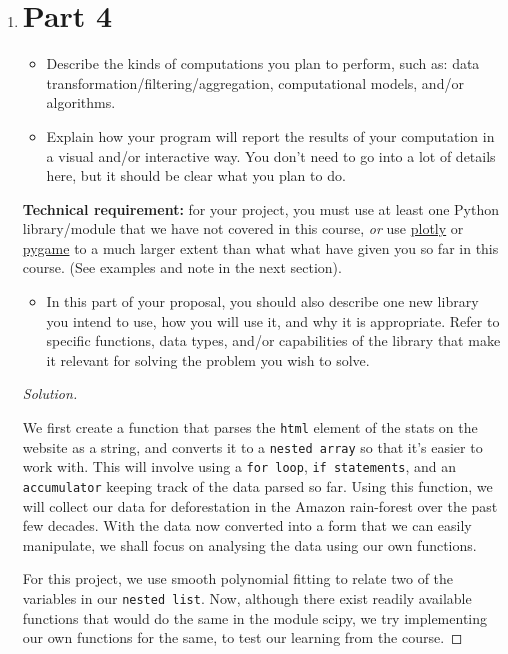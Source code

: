 \documentclass[12pt]{article}
\newenvironment{solution}
  {\renewcommand\qedsymbol{$\blacksquare$}
  \begin{proof}[Solution]}
  {\end{proof}}
\renewcommand\qedsymbol{$\blacksquare$}
\begin{document}
\begin{enumerate}
\newpage

\item \section*{Part 4}

\begin{itemize}
    \item Describe the kinds of computations you plan to perform, such as: data transformation/filtering/aggregation, computational models, and/or algorithms.
    \item Explain how your program will report the results of your computation in a visual and/or interactive way. You don’t need to go into a lot of details here, but it should be clear what you plan to do.
\end{itemize}

\textbf{Technical requirement:} for your project, you must use at least one Python library/module that we have not covered in this course, \emph{or} use \underline{plotly} or \underline{pygame} to a much larger extent than what what have given you so far in this course. (See examples and note in the next section).

\begin{itemize}
    \item In this part of your proposal, you should also describe one new library you intend to use, how you will use it, and why it is appropriate. Refer to specific functions, data types, and/or capabilities of the library that make it relevant for solving the problem you wish to solve.
\end{itemize}

\begin{solution}\

We first create a function that parses the \texttt{html} element of the stats on the website as a string, and converts it to a \texttt{nested array} so that it’s easier to work with. This will involve using a \texttt{for loop}, \texttt{if statements}, and an \texttt{accumulator} keeping track of the data parsed so far. Using this function, we will collect our data for deforestation in the Amazon rain-forest over the past few decades. With the data now converted into a form that we can easily manipulate, we shall focus on analysing the data using our own functions.

For this project, we use smooth polynomial fitting to relate two of the variables in our \texttt{nested list}. Now, although there exist readily available functions that would do the same in the module scipy, we try implementing our own functions for the same, to test our learning from the course.


\end{solution}
\end{enumerate}
\end{document}
